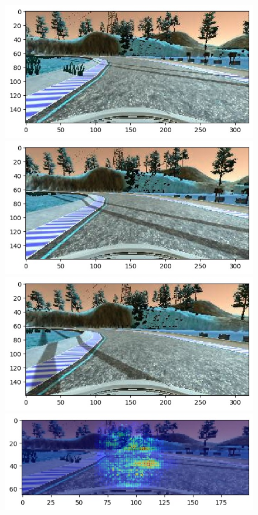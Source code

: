 \documentclass[10pt,twocolumn,letterpaper]{article}
\begin{document}
\begin{figure}[h!]
    \centering
    \includegraphics[scale=0.22]{2nd-track/no-center_2019_04_02_19_35_18_729.jpg}
    \includegraphics[scale=0.22]{2nd-track/no-center_2019_04_02_19_35_19_438.jpg}
    \includegraphics[scale=0.22]{2nd-track/no-center_2019_04_02_19_35_20_131.jpg}
    \\
    \includegraphics[scale=0.33]{2nd-track/yes10-center_2019_04_02_19_35_18_729.jpg} \\

\end{figure}
\end{document}
